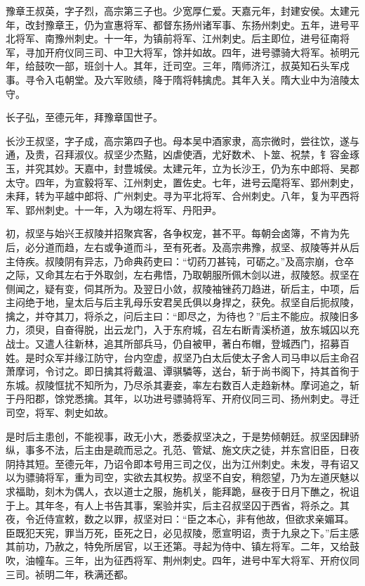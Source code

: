 \documentclass[]{article}
\begin{document}
豫章王叔英，字子烈，高宗第三子也。少宽厚仁爱。天嘉元年，封建安侯。太建元年，改封豫章王，仍为宣惠将军、都督东扬州诸军事、东扬州刺史。五年，进号平北将军、南豫州刺史。十一年，为镇前将军、江州刺史。后主即位，进号征南将军，寻加开府仪同三司、中卫大将军，馀并如故。四年，进号骠骑大将军。祯明元年，给鼓吹一部，班剑十人。其年，迁司空。三年，隋师济江，叔英知石头军戍事。寻令入屯朝堂。及六军败绩，降于隋将韩擒虎。其年入关。隋大业中为涪陵太守。

长子弘，至德元年，拜豫章国世子。

长沙王叔坚，字子成，高宗第四子也。母本吴中酒家隶，高宗微时，尝往饮，遂与通，及贵，召拜淑仪。叔坚少杰黠，凶虐使酒，尤好数术、卜筮、祝禁，钅容金琢玉，并究其妙。天嘉中，封豊城侯。太建元年，立为长沙王，仍为东中郎将、吴郡太守。四年，为宣毅将军、江州刺史，置佐史。七年，进号云麾将军、郢州刺史，未拜，转为平越中郎将、广州刺史。寻为平北将军、合州刺史。八年，复为平西将军、郢州刺史。十一年，入为翊左将军、丹阳尹。

初，叔坚与始兴王叔陵并招聚宾客，各争权宠，甚不平。每朝会卤簿，不肯为先后，必分道而趋，左右或争道而斗，至有死者。及高宗弗豫，叔坚、叔陵等并从后主侍疾。叔陵阴有异志，乃命典药吏曰：``切药刀甚钝，可砺之。''及高宗崩，仓卒之际，又命其左右于外取剑，左右弗悟，乃取朝服所佩木剑以进，叔陵怒。叔坚在侧闻之，疑有变，伺其所为。及翌日小敛，叔陵袖锉药刀趋进，斫后主，中项，后主闷绝于地，皇太后与后主乳母乐安君吴氏俱以身捍之，获免。叔坚自后扼叔陵，擒之，并夺其刀，将杀之，问后主曰：``即尽之，为待也？''后主不能应。叔陵旧多力，须臾，自奋得脱，出云龙门，入于东府城，召左右断青溪桥道，放东城囚以充战士。又遣人往新林，追其所部兵马，仍自被甲，著白布帽，登城西门，招募百姓。是时众军并缘江防守，台内空虚，叔坚乃白太后使太子舍人司马申以后主命召萧摩诃，令讨之。即日擒其将戴温、谭骐驎等，送台，斩于尚书阁下，持其首徇于东城。叔陵恇扰不知所为，乃尽杀其妻妾，率左右数百人走趋新林。摩诃追之，斩于丹阳郡，馀党悉擒。其年，以功进号骠骑将军、开府仪同三司、扬州刺史。寻迁司空，将军、刺史如故。

是时后主患创，不能视事，政无小大，悉委叔坚决之，于是势倾朝廷。叔坚因肆骄纵，事多不法，后主由是疏而忌之。孔范、管斌、施文庆之徒，并东宫旧臣，日夜阴持其短。至德元年，乃诏令即本号用三司之仪，出为江州刺史。未发，寻有诏又以为骠骑将军，重为司空，实欲去其权势。叔坚不自安，稍怨望，乃为左道厌魅以求福助，刻木为偶人，衣以道士之服，施机关，能拜跪，昼夜于日月下醮之，祝诅于上。其年冬，有人上书告其事，案验并实，后主召叔坚囚于西省，将杀之。其夜，令近侍宣敕，数之以罪，叔坚对曰：``臣之本心，非有他故，但欲求亲媚耳。臣既犯天宪，罪当万死，臣死之日，必见叔陵，愿宣明诏，责于九泉之下。''后主感其前功，乃赦之，特免所居官，以王还第。寻起为侍中、镇左将军。二年，又给鼓吹，油幢车。三年，出为征西将军、荆州刺史。四年，进号中军大将军、开府仪同三司。祯明二年，秩满还都。
\end{document}
